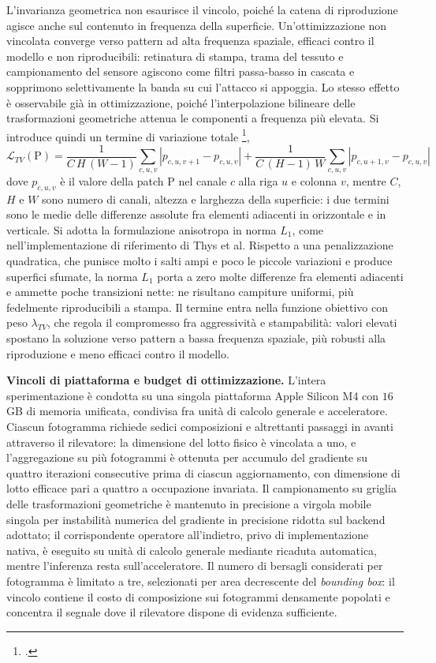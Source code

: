 \ifstampa\documentclass[a4paper,12pt,twoside,openright]{report}\else\documentclass[a4paper,12pt]{report}\fi
\newif\ifrevisione \revisionefalse
\DeclareRobustCommand{\rev}[1]{\ifrevisione{\color{blue!65!black}#1}\else#1\fi}
\begin{document}
L'invarianza geometrica non esaurisce il vincolo, poiché la catena di
riproduzione agisce anche sul contenuto in frequenza della superficie.
Un'ottimizzazione non vincolata converge verso pattern ad alta frequenza
spaziale, efficaci contro il modello e non riproducibili: retinatura di stampa,
trama del tessuto e campionamento del sensore agiscono come filtri passa-basso
in cascata e sopprimono selettivamente la banda su cui l'attacco si appoggia. Lo
stesso effetto è osservabile già in ottimizzazione, poiché l'interpolazione
bilineare delle trasformazioni geometriche attenua le componenti a frequenza più
elevata. Si introduce quindi un termine di variazione totale
\footcite{thys_2019},
\begin{equation}
    \mathcal{L}_{TV}(\mathrm{P}) =
    \frac{1}{C\,H\,(W-1)} \sum_{c,u,v} \left| p_{c,u,v+1} - p_{c,u,v} \right|
    + \frac{1}{C\,(H-1)\,W} \sum_{c,u,v} \left| p_{c,u+1,v} - p_{c,u,v} \right|
    \label{eq:tv}
\end{equation}
dove $p_{c,u,v}$ è il valore della patch $\mathrm{P}$ nel canale $c$ alla
\rev{riga $u$ e colonna $v$}, mentre $C$, $H$ e $W$ sono numero di canali,
altezza e larghezza della superficie\rev{: i due termini sono le medie delle
differenze assolute fra elementi adiacenti in orizzontale e in verticale}. Si
adotta la formulazione anisotropa in norma $L_1$\rev{, come nell'implementazione di riferimento di Thys et al.
Rispetto a una penalizzazione quadratica, che punisce molto i salti ampi e poco
le piccole variazioni e produce superfici sfumate, la norma $L_1$ porta a zero
molte differenze fra elementi adiacenti e ammette poche transizioni nette:
ne risultano campiture uniformi, più fedelmente riproducibili a stampa.} Il termine entra nella
funzione obiettivo con peso $\lambda_{TV}$, che regola il compromesso fra
aggressività e stampabilità: valori elevati spostano la soluzione verso pattern
a bassa frequenza spaziale, più robusti alla riproduzione e meno efficaci contro
il modello.

\textbf{Vincoli di piattaforma e budget di ottimizzazione.}
\label{sec:accumulo}
L'intera sperimentazione è condotta su una singola piattaforma Apple Silicon M4
con $16$\,GB di memoria unificata, condivisa fra unità di calcolo generale e
acceleratore. Ciascun fotogramma richiede sedici composizioni e altrettanti
passaggi in avanti attraverso il rilevatore: la dimensione del lotto fisico è
vincolata a uno, e l'aggregazione su più fotogrammi è ottenuta per accumulo del
gradiente su quattro iterazioni consecutive prima di ciascun aggiornamento, con
dimensione di lotto efficace pari a quattro a occupazione invariata. Il
campionamento su griglia delle trasformazioni geometriche è mantenuto in
precisione a virgola mobile singola per instabilità numerica del gradiente in
precisione ridotta sul backend adottato; il corrispondente operatore
all'indietro, privo di implementazione nativa, è eseguito su unità di calcolo
generale mediante ricaduta automatica, mentre l'inferenza resta
sull'acceleratore. Il numero di bersagli considerati per fotogramma è limitato a
tre, selezionati per area decrescente del \textit{bounding box}: il vincolo
contiene il costo di composizione sui fotogrammi densamente popolati e concentra
il segnale dove il rilevatore dispone di evidenza sufficiente.
\end{document}
